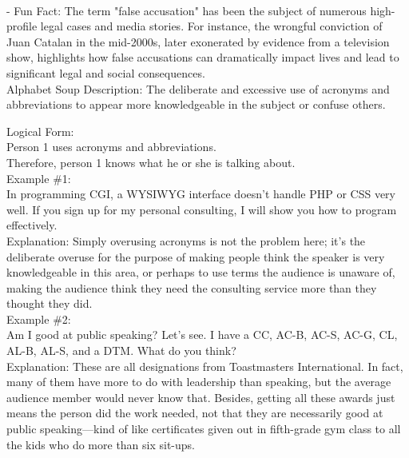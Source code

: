 \documentclass[a4paper,12pt,single,pdftex]{scrbook}
\begin{document}
    
      
    \\

    
      - Fun Fact: The term "false accusation" has been the subject of numerous high-profile legal cases and media stories. For instance, the wrongful conviction of Juan Catalan in the mid-2000s, later exonerated by evidence from a television show, highlights how false accusations can dramatically impact lives and lead to significant legal and social consequences.
    \\

  

Alphabet Soup
    Description: The deliberate and excessive use of acronyms and abbreviations to appear more knowledgeable in the subject or confuse others.

    
      Logical Form:
    \\

    
      Person 1 uses acronyms and abbreviations.
    \\

    
      Therefore, person 1 knows what he or she is talking about.
    \\

    
      Example \#1:
    \\

    
      In programming CGI, a WYSIWYG interface doesn't handle PHP or CSS very well. If you sign up for my personal consulting, I will show you how to program effectively.
    \\

    
      Explanation: Simply overusing acronyms is not the problem here; it's the deliberate overuse for the purpose of making people think the speaker is very knowledgeable in this area, or perhaps to use terms the audience is unaware of, making the audience think they need the consulting service more than they thought they did.
    \\

    
      Example \#2:
    \\

    
      Am I good at public speaking? Let's see. I have a CC, AC-B, AC-S, AC-G, CL, AL-B, AL-S, and a DTM. What do you think?
    \\

    
      Explanation: These are all designations from Toastmasters International. In fact, many of them have more to do with leadership than speaking, but the average audience member would never know that. Besides, getting all these awards just means the person did the work needed, not that they are necessarily good at public speaking—kind of like certificates given out in fifth-grade gym class to all the kids who do more than six sit-ups.
    \\
\end{document}
